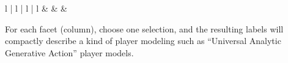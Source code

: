 \begin{table}[ht]
{\begin{tabulary}{\textwidth}{ l | l | l | l }
			 & & &  \\

		\end{tabulary}}
\end{table}

For each facet (column), choose one selection, and the resulting labels will compactly describe a kind of player modeling such as “Universal Analytic Generative Action” player models.